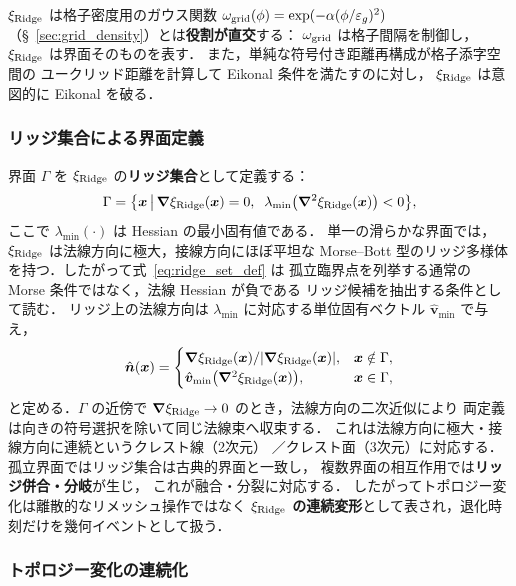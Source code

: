 \begin{remark}[他の補助場との区別]
$\xi_{\text{Ridge}}$ は格子密度用のガウス関数 $\omega_{\text{grid}}(\phi) = \exp(-\alpha(\phi/\varepsilon_g)^2)$
（§~\ref{sec:grid_density}）とは\textbf{役割が直交}する：
$\omega_{\text{grid}}$ は格子間隔を制御し，$\xi_{\text{Ridge}}$ は界面そのものを表す．
また，単純な符号付き距離再構成が格子添字空間の
ユークリッド距離を計算して Eikonal 条件を満たすのに対し，
$\xi_{\text{Ridge}}$ は意図的に Eikonal を破る．
\end{remark}

\subsubsection{リッジ集合による界面定義}

界面 $\Gamma$ を $\xi_{\text{Ridge}}$ の\textbf{リッジ集合}として定義する：
\begin{equation}
  \Gamma = \bigl\{\bm{x} \,\big|\, \bm{\nabla}\xi_{\text{Ridge}}(\bm{x}) = 0,\;\;
  \lambda_{\min}\bigl(\bm{\nabla}^2\xi_{\text{Ridge}}(\bm{x})\bigr) < 0 \bigr\},
  \label{eq:ridge_set_def}
\end{equation}
ここで $\lambda_{\min}(\cdot)$ は Hessian の最小固有値である．
単一の滑らかな界面では，$\xi_{\text{Ridge}}$ は法線方向に極大，接線方向にほぼ平坦な
Morse--Bott 型のリッジ多様体を持つ．したがって式~\eqref{eq:ridge_set_def} は
孤立臨界点を列挙する通常の Morse 条件ではなく，法線 Hessian が負である
リッジ候補を抽出する条件として読む．
リッジ上の法線方向は $\lambda_{\min}$ に対応する単位固有ベクトル $\hat{\bm{v}}_{\min}$ で与え，
\begin{equation}
  \hat{\bm n}(\bm{x}) =
  \begin{cases}
    \bm{\nabla}\xi_{\text{Ridge}}(\bm{x})/|\bm{\nabla}\xi_{\text{Ridge}}(\bm{x})|, & \bm{x} \notin \Gamma, \\
    \hat{\bm{v}}_{\min}\bigl(\bm{\nabla}^2\xi_{\text{Ridge}}(\bm{x})\bigr), & \bm{x} \in \Gamma,
  \end{cases}
\end{equation}
と定める．$\Gamma$ の近傍で $\bm{\nabla}\xi_{\text{Ridge}}\to 0$ のとき，法線方向の二次近似により
両定義は向きの符号選択を除いて同じ法線束へ収束する．
これは法線方向に極大・接線方向に連続というクレスト線（2次元）
／クレスト面（3次元）に対応する．
孤立界面ではリッジ集合は古典的界面と一致し，
複数界面の相互作用では\textbf{リッジ併合・分岐}が生じ，
これが融合・分裂に対応する．
したがってトポロジー変化は離散的なリメッシュ操作ではなく
\textbf{$\xi_{\text{Ridge}}$ の連続変形}として表され，退化時刻だけを幾何イベントとして扱う．

\subsubsection{トポロジー変化の連続化}

